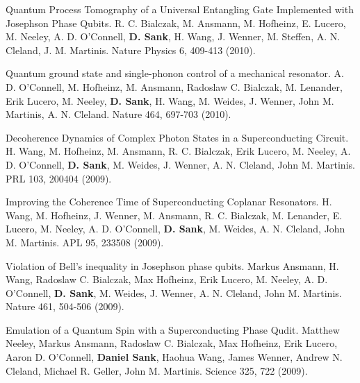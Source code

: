 \documentclass[margin=2cm,line]{res}
\begin{document}
\begin{resume}
\begin{list3}
\item Quantum Process Tomography of a Universal Entangling Gate Implemented with Josephson Phase Qubits. R. C. Bialczak, M. Ansmann, M. Hofheinz, E. Lucero, M. Neeley, A. D. O'Connell, \textbf{D. Sank}, H. Wang, J. Wenner, M. Steffen, A. N. Cleland, J. M. Martinis. Nature Physics 6, 409-413 (2010). \\

\end{list3}

\pagebreak

\begin{list3}

\item Quantum ground state and single-phonon control of a mechanical resonator. A. D. O'Connell, M. Hofheinz, M. Ansmann, Radoslaw C. Bialczak, M. Lenander, Erik Lucero, M. Neeley, \textbf{D. Sank}, H. Wang, M. Weides, J. Wenner, John M. Martinis, A. N. Cleland. Nature 464, 697-703 (2010). \\

\item Decoherence Dynamics of Complex Photon States in a Superconducting Circuit. H. Wang, M. Hofheinz, M. Ansmann, R. C. Bialczak, Erik Lucero, M. Neeley, A. D. O'Connell, \textbf{D. Sank}, M. Weides, J. Wenner, A. N. Cleland, John M. Martinis. PRL 103, 200404 (2009). \\

\item Improving the Coherence Time of Superconducting Coplanar Resonators. H. Wang, M. Hofheinz, J. Wenner, M. Ansmann, R. C. Bialczak, M. Lenander, E. Lucero, M. Neeley, A. D. O'Connell, \textbf{D. Sank}, M. Weides, A. N. Cleland, John M. Martinis. APL 95, 233508 (2009). \\

\item Violation of Bell's inequality in Josephson phase qubits. Markus Ansmann, H. Wang, Radoslaw C. Bialczak, Max Hofheinz, Erik Lucero, M. Neeley, A. D. O'Connell, \textbf{D. Sank}, M. Weides, J. Wenner, A. N. Cleland, John M. Martinis. Nature 461, 504-506 (2009).

\item Emulation of a Quantum Spin with a Superconducting Phase Qudit. Matthew Neeley, Markus Ansmann, Radoslaw C. Bialczak, Max Hofheinz, Erik Lucero, Aaron D. O'Connell, \textbf{Daniel Sank}, Haohua Wang, James Wenner, Andrew N. Cleland, Michael R. Geller, John M. Martinis. Science 325, 722 (2009). \\


\end{list3}
\end{resume}
\end{document}
